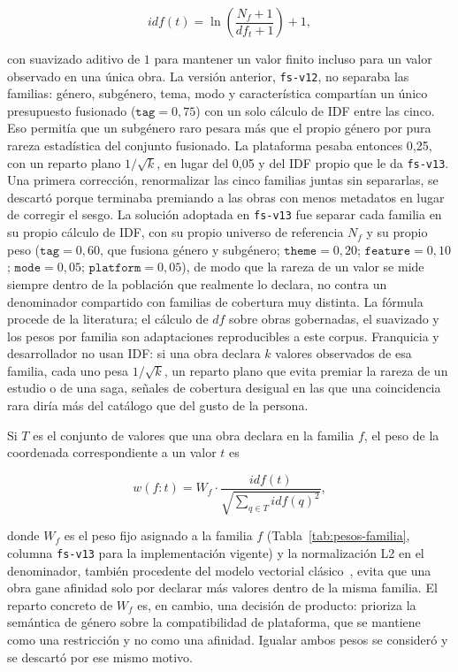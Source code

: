 \begin{equation}\label{eq:idf}
idf(t) = \ln\!\left(\frac{N_f + 1}{df_t + 1}\right) + 1 ,
\end{equation}

con suavizado aditivo de \(1\) para mantener un valor finito incluso para un valor observado
en una única obra. La versión anterior, \texttt{fs-v12}, no separaba las familias: género,
subgénero, tema, modo y característica compartían un único presupuesto fusionado
(\(\mathtt{tag}=0{,}75\)) con un solo cálculo de IDF entre las cinco. Eso permitía que un
subgénero raro pesara más que el propio género por pura rareza estadística del conjunto
fusionado. La plataforma pesaba entonces 0,25, con un reparto plano \(1/\sqrt{k}\), en lugar
del 0,05 y del IDF propio que le da \texttt{fs-v13}. Una primera corrección, renormalizar las cinco familias juntas sin separarlas,
se descartó porque terminaba premiando a las obras con menos metadatos en lugar de corregir el
sesgo. La solución adoptada en \texttt{fs-v13} fue separar cada familia en su propio cálculo de
IDF, con su propio universo de referencia \(N_f\) y su propio peso (\(\mathtt{tag}=0{,}60\),
que fusiona género y subgénero; \(\mathtt{theme}=0{,}20\); \(\mathtt{feature}=0{,}10\);
\(\mathtt{mode}=0{,}05\); \(\mathtt{platform}=0{,}05\)), de modo que la rareza de un valor se
mide siempre dentro de la población que realmente lo declara, no contra un denominador
compartido con familias de cobertura muy distinta. La fórmula procede de la literatura; el
cálculo de \(df\) sobre obras gobernadas, el suavizado y los pesos por familia son adaptaciones
reproducibles a este corpus. Franquicia
y desarrollador no usan IDF: si una obra declara \(k\) valores observados de esa familia, cada
uno pesa \(1/\sqrt{k}\), un reparto plano que evita premiar la rareza de un estudio o de una
saga, señales de cobertura desigual en las que una coincidencia rara diría más del catálogo que
del gusto de la persona.

Si \(T\) es el conjunto de valores que una obra declara en la familia \(f\), el peso de la
coordenada correspondiente a un valor \(t\) es

\begin{equation}\label{eq:facet-weight}
w(f{:}t) = W_f \cdot \frac{idf(t)}{\sqrt{\sum_{q \in T} idf(q)^2}} ,
\end{equation}

donde \(W_f\) es el peso fijo asignado a la familia \(f\) (Tabla~\ref{tab:pesos-familia}, columna
\texttt{fs-v13} para la implementación vigente) y la
normalización L2 en el denominador, también procedente del modelo vectorial
clásico~\cite{salton1988term}, evita que una obra gane afinidad solo por declarar más valores
dentro de la misma familia. El reparto concreto de \(W_f\) es, en cambio, una decisión de
producto: prioriza la semántica de género sobre la compatibilidad de plataforma, que se
mantiene como una restricción y no como una afinidad. Igualar ambos pesos se consideró y se
descartó por ese mismo motivo.


